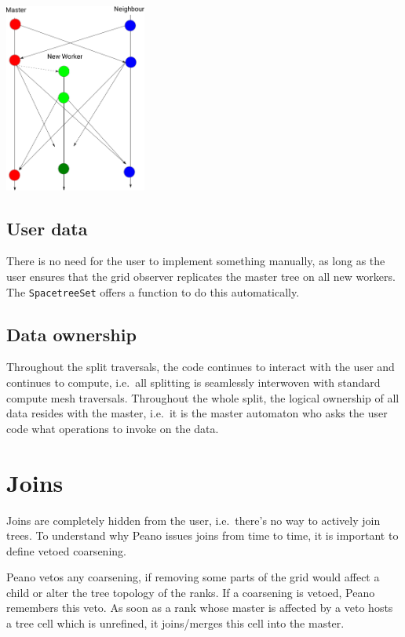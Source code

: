 \begin{center}
 \includegraphics[width=0.35\textwidth]{51_domain-decomposition/split-data-flow.pdf}
\end{center}





\subsection{User data}

There is no need for the user to implement something manually, as long as the
user ensures that the grid observer replicates the master tree on all new
workers.
The \texttt{SpacetreeSet} offers a function to do this automatically.


\subsection{Data ownership}

Throughout the split traversals, the code continues to interact with the user
and continues to compute, i.e.~all splitting is seamlessly interwoven with
standard compute mesh traversals.
Throughout the whole split, the logical ownership of all data resides with the
master, i.e.~it is the master automaton who asks the user code what operations to invoke
on the data. 


\section{Joins}


Joins are completely hidden from the user, i.e.~there's no way to actively join
trees. 
To understand why Peano issues joins from time to time, it is important to
define vetoed coarsening.

\begin{definition}
 Peano vetos any coarsening, if removing some parts of the grid would affect a
 child or alter the tree topology of the ranks.
 If a coarsening is vetoed, Peano remembers this veto. 
 As soon as a rank whose master is affected by a veto hosts a tree cell which is
 unrefined, it joins/merges this cell into the master.
\end{definition}

